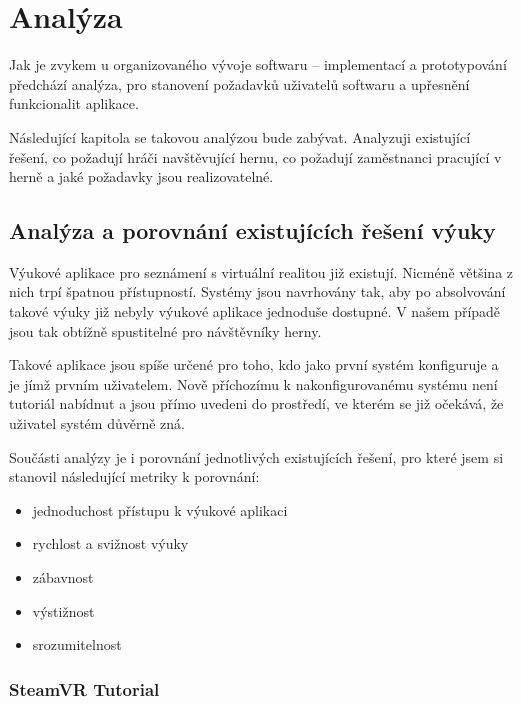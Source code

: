 \section{Analýza}\label{analuxfdza}

Jak je zvykem u organizovaného vývoje softwaru -- implementací a
prototypování předchází analýza, pro stanovení požadavků uživatelů
softwaru a upřesnění funkcionalit aplikace.

Následující kapitola se takovou analýzou bude zabývat. Analyzuji
existující řešení, co požadují hráči navštěvující hernu, co požadují
zaměstnanci pracující v herně a jaké požadavky jsou realizovatelné.

\subsection{Analýza a porovnání existujících řešení
výuky}\label{analuxfdza-a-porovnuxe1nuxed-existujuxedcuxedch-ux159eux161enuxed-vuxfduky}

Výukové aplikace pro seznámení s virtuální realitou již existují.
Nicméně většina z nich trpí špatnou přístupností. Systémy jsou
navrhovány tak, aby po absolvování takové výuky již nebyly výukové
aplikace jednoduše dostupné. V našem případě jsou tak obtížně
spustitelné pro návštěvníky herny.

Takové aplikace jsou spíše určené pro toho, kdo jako první systém
konfiguruje a je jímž prvním uživatelem. Nově příchozímu k
nakonfigurovanému systému není tutoriál nabídnut a jsou přímo uvedeni do
prostředí, ve kterém se již očekává, že uživatel systém důvěrně zná.

Součásti analýzy je i porovnání jednotlivých existujících řešení, pro
které jsem si stanovil následující metriky k porovnání:

\begin{itemize}
\tightlist
\item
  jednoduchost přístupu k výukové aplikaci
\item
  rychlost a svižnost výuky
\item
  zábavnost
\item
  výstižnost
\item
  srozumitelnost
\end{itemize}

\subsubsection{SteamVR Tutorial}\label{steamvr-tutorial}

